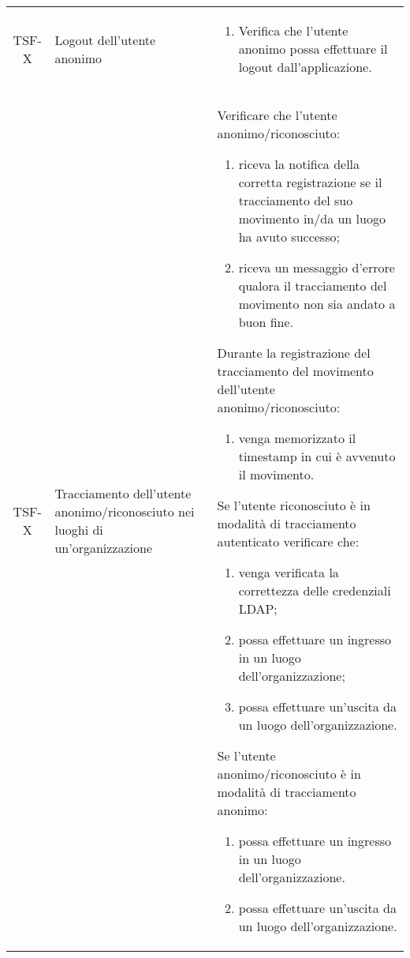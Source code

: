 {\begin{longtable}{ c | C{3cm} | C{11cm} }
TSF-X & Logout dell'utente anonimo & \begin{enumerate}
    \item Verifica che l'utente anonimo possa effettuare il logout dall'applicazione.
\end{enumerate} \\

TSF-X & Tracciamento dell'utente anonimo/riconosciuto nei luoghi di un'organizzazione &
Verificare che l'utente anonimo/riconosciuto:
\begin{enumerate}
    \item riceva la notifica della corretta registrazione se il tracciamento del suo movimento in/da un luogo ha avuto successo;
    \item riceva un messaggio d'errore qualora il tracciamento del movimento non sia andato a buon fine.
\end{enumerate}
Durante la registrazione del tracciamento del movimento dell'utente anonimo/riconosciuto:
\begin{enumerate}
    \item venga memorizzato il timestamp in cui è avvenuto il movimento.
\end{enumerate}
Se l'utente riconosciuto è in modalità di tracciamento autenticato verificare che:
\begin{enumerate}
    \item venga verificata la correttezza delle credenziali LDAP;
    \item possa effettuare un ingresso in un luogo dell'organizzazione;
    \item possa effettuare un'uscita da un luogo dell'organizzazione.
\end{enumerate}
Se l'utente anonimo/riconosciuto è in modalità di tracciamento anonimo:
\begin{enumerate}
    \item possa effettuare un ingresso in un luogo dell'organizzazione.
    \item possa effettuare un'uscita da un luogo dell'organizzazione.
\end{enumerate} \\


\end{longtable}}
